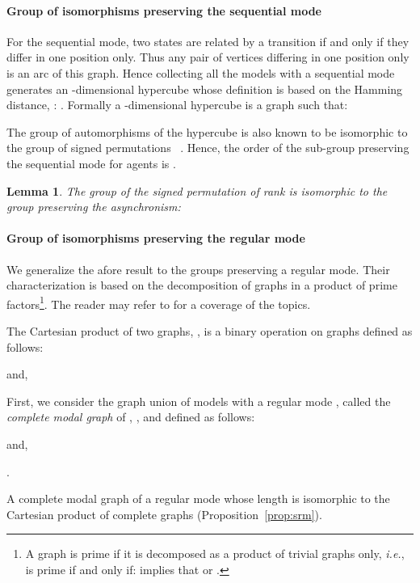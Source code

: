 \documentclass[12pt]{elsarticle}
\newtheorem{lemma}{Lemma}
\newcommand{\abbrev}[1]{#1, \relax}
\newcommand{\ie}[0]{\abbrev{\textit{i.e.}}}
\begin{document}
\paragraph{Group of isomorphisms preserving the sequential mode}  For the sequential mode, two states are related by a transition if and only if they differ in one position only. Thus any pair of vertices differing in one position only is an arc of this graph. Hence  collecting all the models with a sequential mode generates an -dimensional hypercube  \cite{Harary1988} whose definition is based on the Hamming distance, : . Formally a -dimensional hypercube  is a graph such that: 

\medskip


\medskip
The group of automorphisms of the hypercube is also known to be isomorphic to the group of signed permutations ~\cite{Chen1993}. Hence, the order of the sub-group preserving the sequential mode for  agents is .
\begin{lemma} 
\label{lem:sequential-group}
The group of the signed permutation of rank  is isomorphic to the group preserving the asynchronism: 
\end{lemma}

\paragraph{Group of isomorphisms preserving the regular mode}
We generalize the afore result to the groups preserving a regular mode. Their characterization is based on the decomposition of graphs in a product of prime factors\footnote{A graph is prime if it is decomposed as a product of trivial graphs only, \ie  is prime if and only if:  implies that  or .}.
 The reader may refer to \cite{Imrich2008, Hammack2011, Sabidussi1959} for a coverage of the topics.

The Cartesian product of two graphs, , is a binary operation on graphs defined as follows:

\medskip
\noindent
 and,

\noindent


\medskip

First, we consider the graph union of models with a regular mode , called the \emph{complete modal graph} of , , and defined as follows:

\medskip
\noindent
 and,

\noindent
.

\medskip
A complete modal graph of a regular mode  whose length is  isomorphic to the Cartesian product of  complete graphs  (Proposition~\ref{prop:srm}). 
\end{document}

